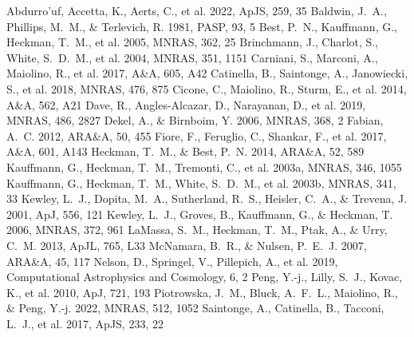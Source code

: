 \documentclass[twocolumn]{aastex631}
\begin{document}
\begin{thebibliography}{}
 Abdurro'uf, Accetta, K., Aerts, C., et al. 2022, ApJS, 259, 35
 Baldwin, J.~A., Phillips, M.~M., \& Terlevich, R. 1981, PASP, 93, 5
 Best, P.~N., Kauffmann, G., Heckman, T.~M., et al. 2005, MNRAS, 362, 25
 Brinchmann, J., Charlot, S., White, S.~D.~M., et al. 2004, MNRAS, 351, 1151
 Carniani, S., Marconi, A., Maiolino, R., et al. 2017, A\&A, 605, A42
 Catinella, B., Saintonge, A., Janowiecki, S., et al. 2018, MNRAS, 476, 875
 Cicone, C., Maiolino, R., Sturm, E., et al. 2014, A\&A, 562, A21
 Dave, R., Angles-Alcazar, D., Narayanan, D., et al. 2019, MNRAS, 486, 2827
 Dekel, A., \& Birnboim, Y. 2006, MNRAS, 368, 2
 Fabian, A.~C. 2012, ARA\&A, 50, 455
 Fiore, F., Feruglio, C., Shankar, F., et al. 2017, A\&A, 601, A143
 Heckman, T.~M., \& Best, P.~N. 2014, ARA\&A, 52, 589
 Kauffmann, G., Heckman, T.~M., Tremonti, C., et al. 2003a, MNRAS, 346, 1055
 Kauffmann, G., Heckman, T.~M., White, S.~D.~M., et al. 2003b, MNRAS, 341, 33
 Kewley, L.~J., Dopita, M.~A., Sutherland, R.~S., Heisler, C.~A., \& Trevena, J. 2001, ApJ, 556, 121
 Kewley, L.~J., Groves, B., Kauffmann, G., \& Heckman, T. 2006, MNRAS, 372, 961
 LaMassa, S.~M., Heckman, T.~M., Ptak, A., \& Urry, C.~M. 2013, ApJL, 765, L33
 McNamara, B.~R., \& Nulsen, P.~E.~J. 2007, ARA\&A, 45, 117
 Nelson, D., Springel, V., Pillepich, A., et al. 2019, Computational Astrophysics and Cosmology, 6, 2
 Peng, Y.-j., Lilly, S.~J., Kovac, K., et al. 2010, ApJ, 721, 193
 Piotrowska, J.~M., Bluck, A.~F.~L., Maiolino, R., \& Peng, Y.-j. 2022, MNRAS, 512, 1052
 Saintonge, A., Catinella, B., Tacconi, L.~J., et al. 2017, ApJS, 233, 22

\end{thebibliography}
\end{document}
